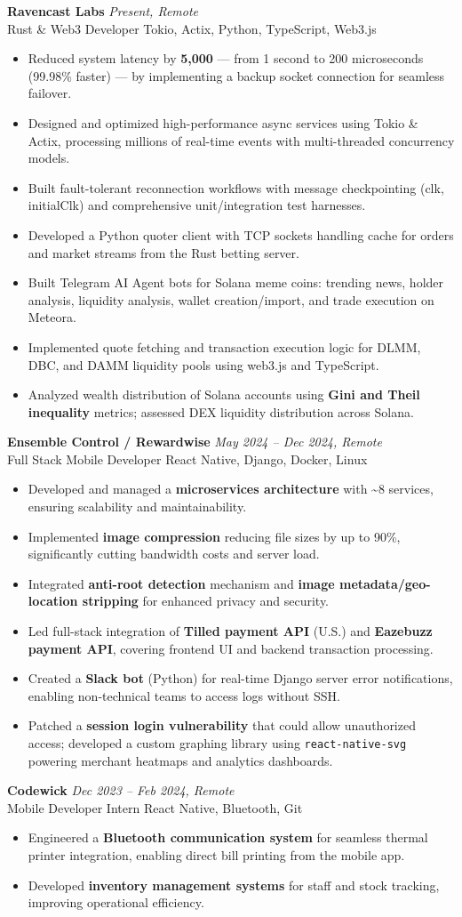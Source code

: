 \documentclass[11pt,letterpaper]{article}
\newcommand{\subsecitem}[4]{
  {\textbf{#1}} \hfill {\small\textit{#2}}\\
  {\small\color{accent}#3} \hfill {\small\textit{#4}}\\
  \vspace{-2pt}
}
\newcommand{\bigbullet}[1]{
  \begin{itemize}[leftmargin=1.2em, itemsep=-1pt, topsep=-2pt, parsep=0pt, partopsep=0pt]
    \item \small{#1}
  \end{itemize}
}
\begin{document}
\subsecitem{Ravencast Labs}{Present, Remote}
          {Rust \& Web3 Developer \textbar{} Tokio, Actix, Python, TypeScript, Web3.js}
          {}
\bigbullet{Reduced system latency by \textbf{5{,}000{\texttimes}} — from 1 second to 200 microseconds (99.98\% faster) — by implementing a backup socket connection for seamless failover.}
\bigbullet{Designed and optimized high-performance async services using Tokio \& Actix, processing millions of real-time events with multi-threaded concurrency models.}
\bigbullet{Built fault-tolerant reconnection workflows with message checkpointing (clk, initialClk) and comprehensive unit/integration test harnesses.}
\bigbullet{Developed a Python quoter client with TCP sockets handling cache for orders and market streams from the Rust betting server.}
\bigbullet{Built Telegram AI Agent bots for Solana meme coins: trending news, holder analysis, liquidity analysis, wallet creation/import, and trade execution on Meteora.}
\bigbullet{Implemented quote fetching and transaction execution logic for DLMM, DBC, and DAMM liquidity pools using web3.js and TypeScript.}
\bigbullet{Analyzed wealth distribution of Solana accounts using \textbf{Gini and Theil inequality} metrics; assessed DEX liquidity distribution across Solana.}

\vspace{2pt}
\subsecitem{Ensemble Control / Rewardwise}{May 2024 -- Dec 2024, Remote}
          {Full Stack Mobile Developer \textbar{} React Native, Django, Docker, Linux}
          {}
\bigbullet{Developed and managed a \textbf{microservices architecture} with \textasciitilde8 services, ensuring scalability and maintainability.}
\bigbullet{Implemented \textbf{image compression} reducing file sizes by up to 90\%, significantly cutting bandwidth costs and server load.}
\bigbullet{Integrated \textbf{anti-root detection} mechanism and \textbf{image metadata/geo-location stripping} for enhanced privacy and security.}
\bigbullet{Led full-stack integration of \textbf{Tilled payment API} (U.S.) and \textbf{Eazebuzz payment API}, covering frontend UI and backend transaction processing.}
\bigbullet{Created a \textbf{Slack bot} (Python) for real-time Django server error notifications, enabling non-technical teams to access logs without SSH.}
\bigbullet{Patched a \textbf{session login vulnerability} that could allow unauthorized access; developed a custom graphing library using \texttt{react-native-svg} powering merchant heatmaps and analytics dashboards.}

\vspace{2pt}
\subsecitem{Codewick}{Dec 2023 -- Feb 2024, Remote}
          {Mobile Developer Intern \textbar{} React Native, Bluetooth, Git}
          {}
\bigbullet{Engineered a \textbf{Bluetooth communication system} for seamless thermal printer integration, enabling direct bill printing from the mobile app.}
\bigbullet{Developed \textbf{inventory management systems} for staff and stock tracking, improving operational efficiency.}
\end{document}
